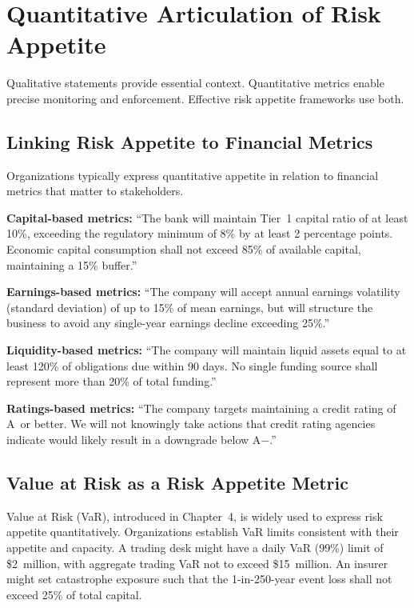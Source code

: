 \documentclass[11pt,openany]{book}
\begin{document}
\section{Quantitative Articulation of Risk Appetite}
\label{sec:quantitative-appetite}

Qualitative statements provide essential context. Quantitative metrics enable
precise monitoring and enforcement. Effective risk appetite frameworks use both.

\subsection{Linking Risk Appetite to Financial Metrics}
\label{subsec:financial-metrics}

Organizations typically express quantitative appetite in relation to financial
metrics that matter to stakeholders.

\textbf{Capital-based metrics:} ``The bank will maintain Tier~1 capital ratio
of at least 10\%, exceeding the regulatory minimum of 8\% by at least 2
percentage points. Economic capital consumption shall not exceed 85\% of
available capital, maintaining a 15\% buffer.''

\textbf{Earnings-based metrics:} ``The company will accept annual earnings
volatility (standard deviation) of up to 15\% of mean earnings, but will
structure the business to avoid any single-year earnings decline exceeding
25\%.''

\textbf{Liquidity-based metrics:} ``The company will maintain liquid assets
equal to at least 120\% of obligations due within 90 days. No single funding
source shall represent more than 20\% of total funding.''

\textbf{Ratings-based metrics:} ``The company targets maintaining a credit
rating of A~or better. We will not knowingly take actions that credit rating
agencies indicate would likely result in a downgrade below A$-$.''

\subsection{Value at Risk as a Risk Appetite Metric}
\label{subsec:var-appetite}

Value at Risk (VaR), introduced in Chapter~4, is widely used to express risk
appetite quantitatively. Organizations establish VaR limits consistent with
their appetite and capacity. A trading desk might have a daily VaR (99\%)
limit of \$2~million, with aggregate trading VaR not to exceed \$15~million.
An insurer might set catastrophe exposure such that the 1-in-250-year event
loss shall not exceed 25\% of total capital.
\end{document}

